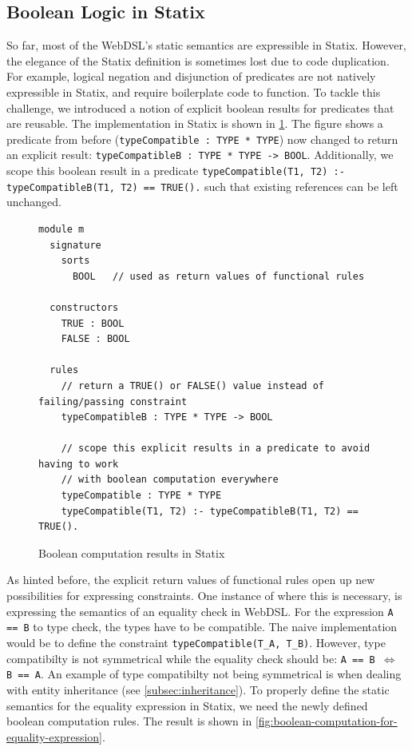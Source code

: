     \subsection{\label{subsec:boolean-logic}Boolean Logic in Statix}

      So far, most of the WebDSL's static semantics are expressible in Statix. However, the elegance of the Statix definition is sometimes lost due to code duplication. For example, logical negation and disjunction of predicates are not natively expressible in Statix, and require boilerplate code to function. To tackle this challenge, we introduced a notion of explicit boolean results for predicates that are reusable. The implementation in Statix is shown in \cref{fig:boolean-computation-results-in-statix}. The figure shows a predicate from before (\texttt{typeCompatible : TYPE * TYPE}) now changed to return an explicit result: \texttt{typeCompatibleB : TYPE * TYPE -> BOOL}. Additionally, we scope this boolean result in a predicate \texttt{typeCompatible(T1, T2) :- typeCompatibleB(T1, T2) == TRUE().} such that existing references can be left unchanged.

      \begin{figure}
        \begin{verbatim}
module m
  signature
    sorts
      BOOL   // used as return values of functional rules

  constructors
    TRUE : BOOL
    FALSE : BOOL

  rules
    // return a TRUE() or FALSE() value instead of failing/passing constraint
    typeCompatibleB : TYPE * TYPE -> BOOL

    // scope this explicit results in a predicate to avoid having to work 
    // with boolean computation everywhere
    typeCompatible : TYPE * TYPE
    typeCompatible(T1, T2) :- typeCompatibleB(T1, T2) == TRUE().
        \end{verbatim}
        \caption{\label{fig:boolean-computation-results-in-statix}Boolean computation results in Statix}
      \end{figure}

      As hinted before, the explicit return values of functional rules open up new possibilities for expressing constraints. One instance of where this is necessary, is expressing the semantics of an equality check in WebDSL. For the expression \texttt{A == B} to type check, the types have to be compatible. The naive implementation would be to define the constraint \texttt{typeCompatible(T\_A, T\_B)}. However, type compatibilty is not symmetrical while the equality check should be: \texttt{A == B $\iff$ B == A}. An example of type compatibilty not being symmetrical is when dealing with entity inheritance (see \cref{subsec:inheritance}). To properly define the static semantics for the equality expression in Statix, we need the newly defined boolean computation rules. The result is shown in \cref{fig:boolean-computation-for-equality-expression}.

